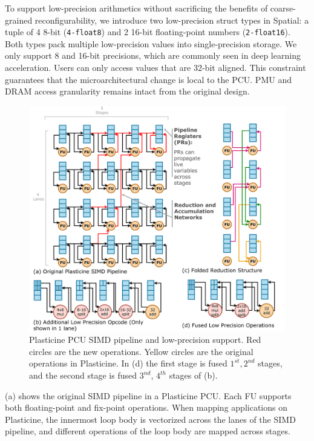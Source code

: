 To support low-precision arithmetics without sacrificing the benefits of coarse-grained reconfigurability,
we introduce two low-precision struct types in Spatial: 
a tuple of 4 8-bit (\texttt{4-float8}) and 2 16-bit floating-point numbers (\texttt{2-float16}).
Both types pack multiple low-precision values into single-precision storage.
We only support 8 and 16-bit precisions, which are commonly seen in deep learning acceleration.
Users can only access values that are 32-bit aligned.
This constraint guarantees that the microarchitectural change is local to the PCU.
PMU and DRAM access granularity remains intact from the original design.

\begin{figure}
  \centering
  \includegraphics[width=1\columnwidth]{figs/lowprec.pdf}
  \caption[Plasticine PCU SIMD pipeline and low-precision support]{Plasticine PCU SIMD pipeline and low-precision support.
  Red circles are the new operations. Yellow circles are the original operations in Plasticine.
  In (d) the first stage is fused $1^{st}, 2^{nd}$ stages, and the second stage is fused
  $3^{nd}$, $4^{th}$ stages of (b).
   }
  \label{fig:lowprec}
\end{figure}
 (a) shows the original SIMD pipeline in a Plasticine PCU.
Each FU supports both floating-point and fix-point operations.
When mapping applications on Plasticine,
  the innermost loop body is vectorized across the lanes of the
SIMD pipeline, and different operations of the loop body are mapped across stages.
